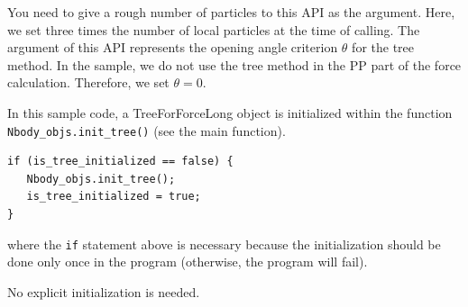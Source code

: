 \begin{description}[leftmargin=*,font=\normalfont\slshape]
You need to give a rough number of particles to this API as the  argument. Here, we set three times the number of local particles at the time of calling. The  argument of this API  represents the opening angle criterion $\theta$ for the tree method. In the sample, we do not use the tree method in the PP part of the force calculation. Therefore, we set $\theta=0$.

\ifCpp
In this sample code, a \textsf{TreeForForceLong} object is initialized within the function \texttt{Nbody\_objs.init\_tree()} (see the main function).
\begin{lstlisting}
if (is_tree_initialized == false) {
   Nbody_objs.init_tree();
   is_tree_initialized = true;
}
\end{lstlisting}
where the \texttt{if} statement above is necessary because the initialization should be done only once in the program (otherwise, the program will fail).
\endifCpp

\item[(iv) Initialization of a \textsf{ParticleMesh} object] No explicit initialization is needed.

\end{description}

